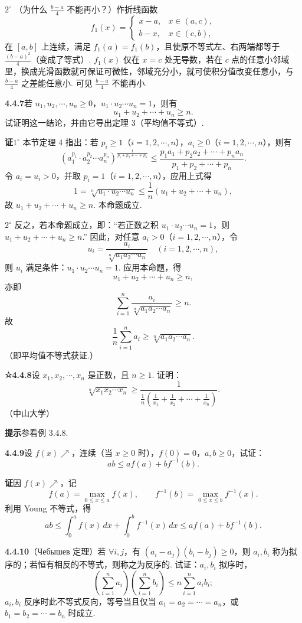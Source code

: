 \documentclass[UTF8, 12pt, fontset=fandol, oneside]{ctexart}
\begin{document}
$2^\circ$ （为什么 $\frac{b-a}{4}$ 不能再小？）作折线函数
\[
f_1(x)=
\begin{cases}
x-a,& x\in(a,c),\\
b-x,& x\in(c,b),
\end{cases}
\]
在 $[a,b]$ 上连续，满足 $f_1(a)=f_1(b)$，且使原不等式左、右两端都等于 $\frac{(b-a)^2}{4}$（变成了等式）. $f_1(x)$ 仅在 $x=c$ 处无导数，若在 $c$ 点的任意小邻域里，换成光滑函数就可保证可微性，邻域充分小，就可使积分值改变任意小，与 $\frac{b-a}{4}$ 之差能任意小. 可见 $\frac{b-a}{4}$ 不能再小.

\noindent\textbf{4.4.7}\quad 若 $u_1,u_2,\cdots,u_n\ge0$，$u_1\cdot u_2\cdots u_n=1$，则有
\[
u_1+u_2+\cdots+u_n\ge n.
\]
试证明这一结论，并由它导出定理 3（平均值不等式）.

\noindent\textbf{证}\quad $1^\circ$ 本节定理 4 指出：若 $p_i\ge1$（$i=1,2,\cdots,n$），$a_i\ge0$（$i=1,2,\cdots,n$），则有
\[
\left(a_1^{p_1}\cdot a_2^{p_2}\cdots a_n^{p_n}\right)^{\frac1{p_1+p_2+\cdots+p_n}}
\le\frac{p_1a_1+p_2a_2+\cdots+p_na_n}{p_1+p_2+\cdots+p_n}.
\]
令 $a_i=u_i>0$，并取 $p_i=1$（$i=1,2,\cdots,n$），应用上式得
\[
1=\sqrt[n]{u_1\cdot u_2\cdots u_n}
\le\frac1n(u_1+u_2+\cdots+u_n),
\]
故 $u_1+u_2+\cdots+u_n\ge n$. 本命题成立.

$2^\circ$ 反之，若本命题成立，即：“若正数之积 $u_1\cdot u_2\cdots u_n=1$，则 $u_1+u_2+\cdots+u_n\ge n$.” 因此，对任意 $a_i>0$（$i=1,2,\cdots,n$），令
\[
u_i=\frac{a_i}{\sqrt[n]{a_1a_2\cdots a_n}}\quad(i=1,2,\cdots,n),
\]
则 $u_i$ 满足条件：$u_1\cdot u_2\cdots u_n=1$. 应用本命题，得
\[
u_1+u_2+\cdots+u_n\ge n,
\]
亦即
\[
\sum_{i=1}^n\frac{a_i}{\sqrt[n]{a_1a_2\cdots a_n}}\ge n.
\]
故
\[
\frac1n\sum_{i=1}^n a_i\ge\sqrt[n]{a_1a_2\cdots a_n}.
\]
（即平均值不等式获证.）

\noindent\textbf{☆4.4.8}\quad 设 $x_1,x_2,\cdots,x_n$ 是正数，且 $n\ge1$. 证明：
\[
\sqrt[n]{x_1x_2\cdots x_n}
\ge
\frac1{\frac1n\left(\frac1{x_1}+\frac1{x_2}+\cdots+\frac1{x_n}\right)}.
\]
（中山大学）

\noindent\textbf{提示}\quad 参看例 3.4.8.

\noindent\textbf{4.4.9}\quad 设 $f(x)\nearrow$，连续（当 $x\ge0$ 时），$f(0)=0$，$a,b\ge0$，试证：
\[
ab\le af(a)+bf^{-1}(b).
\]

\noindent\textbf{证}\quad 因 $f(x)\nearrow$，记
\[
f(a)=\max_{0\le x\le a}f(x),\qquad
f^{-1}(b)=\max_{0\le x\le b}f^{-1}(x).
\]
利用 Young 不等式，得
\[
ab\le\int_0^a f(x)\,dx+\int_0^b f^{-1}(x)\,dx
\le af(a)+bf^{-1}(b).
\]

\noindent\textbf{4.4.10}\quad （Чебышев 定理）若 $\forall i,j$，有 $(a_i-a_j)(b_i-b_j)\ge0$，则 $a_i,b_i$ 称为拟序的；若恒有相反的不等式，则称之为反序的. 试证：$a_i,b_i$ 拟序时，
\[
\left(\sum_{i=1}^n a_i\right)\left(\sum_{i=1}^n b_i\right)
\le n\sum_{i=1}^n a_i b_i;
\]
$a_i,b_i$ 反序时此不等式反向，等号当且仅当 $a_1=a_2=\cdots=a_n$，或 $b_1=b_2=\cdots=b_n$ 时成立.
\end{document}
